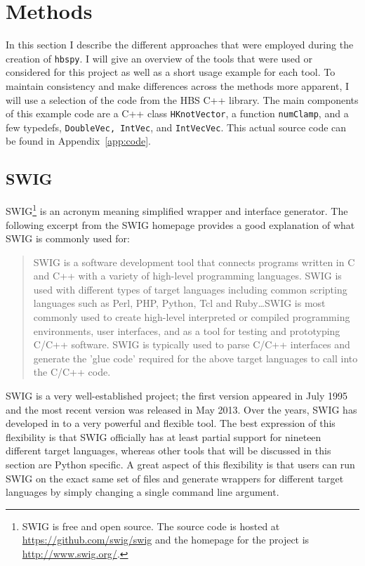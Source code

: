 
\section{Methods} \label{sec:methods}

In this section I describe the different approaches that were employed  during the creation of \texttt{hbspy}. I will give an overview of the tools that were used or considered for this project as well as a short usage example for each tool. To maintain consistency and make differences across the methods more apparent, I will use a selection of the code from the HBS C++ library. The main components of this example code are a C++ class \texttt{HKnotVector}, a function \texttt{numClamp}, and a few typedefs, \texttt{DoubleVec, IntVec}, and \texttt{IntVecVec}. This actual source code can be found in Appendix~\ref{app:code}.

\subsection{SWIG} \label{sub:swig}

  SWIG\footnote{SWIG is free and open source. The source code is hosted at \url{https://github.com/swig/swig} and the homepage for the project is \url{http://www.swig.org/}.} is an acronym meaning simplified wrapper and interface generator. The following excerpt from the SWIG homepage provides a good explanation of what SWIG is commonly used for:

  \begin{quote}
    SWIG is a software development tool that connects programs written in C and C++ with a variety of high-level programming languages. SWIG is used with different types of target languages including common scripting languages such as Perl, PHP, Python, Tcl and Ruby\ldots SWIG is most commonly used to create high-level interpreted or compiled programming environments, user interfaces, and as a tool for testing and prototyping C/C++ software. SWIG is typically used to parse C/C++ interfaces and generate the 'glue code' required for the above target languages to call into the C/C++ code.
  \end{quote}
  \mainstretch{}

  \noindent  SWIG is a very well-established project; the first version appeared in July 1995 and the most recent version was released in May 2013. Over the years, SWIG has developed in to a very powerful and flexible tool. The best expression of this flexibility is that SWIG officially has at least partial support for nineteen different target languages, whereas other tools that will be discussed in this section are Python specific. A great aspect of this flexibility is that users can run SWIG on the exact same set of files and generate wrappers for different target languages by simply changing a single command line argument.

